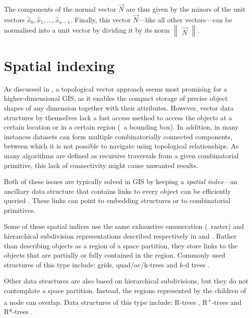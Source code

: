The components of the normal vector $\vec{N}$ are thus given by the minors of the unit vectors $\hat{x}_0, \hat{x}_1, \ldots, \hat{x}_{n-1}$.
Finally, this vector $\vec{N}$---like all other vectors---can be normalised into a unit vector by dividing it by its norm $\begin{Vmatrix} \vec{N} \end{Vmatrix}$.

\section{Spatial indexing}
\label{se:spatial-indexing}

As discussed in , a topological vector approach seems most promising for a higher-dimensional GIS, as it enables the compact storage of precise object shapes of any dimension together with their attributes.
However, vector data structures by themselves lack a fast access method to access the objects at a certain location or in a certain region (\eg\ a bounding box).
In addition, in many instances datasets can form multiple combinatorially connected components, between which it is not possible to navigate using topological relationships.
As many algorithms are defined as recursive traversals from a given combinatorial primitive, this lack of connectivity might cause unwanted results.

Both of these issues are typically solved in GIS by keeping a \emph{spatial index}---an ancillary data structure that contains links to every object can be efficiently queried \citep{vanOosterom99}.
These links can point to embedding structures or to combinatorial primitives.

Some of these spatial indices use the same exhaustive enumeration (\ie\ raster) and hierarchical subdivision representations described respectively in  and .
Rather than describing objects as a region of a space partition, they store links to the objects that are partially or fully contained in the region.
Commonly used structures of this type include: grids, quad/oc/k-trees \citep{Finkel74,Meagher80,Yau83,Jackins83} and $k$-d trees \citep{Bentley75}.

Other data structures are also based on hierarchical subdivisions, but they do not contemplate a space partition.
Instead, the regions represented by the children of a node can overlap.
Data structures of this type include: R-trees \citep{Guttman84}, R\textsuperscript{+}-trees \citep{Sellis87} and R*-trees \citep{Beckmann90}.

